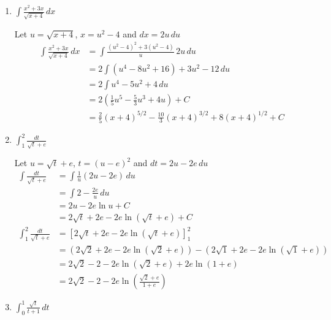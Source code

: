 \documentclass[12pt]{article}
\begin{document}
\begin{enumerate}
\item $\displaystyle\int\frac{x^{2}+3x}{\sqrt{x+4}}\,dx$

Let $u=\sqrt{x+4}$, $x=u^{2}-4$ and $dx=2u\,du$
\begin{equation*}
  \begin{aligned}
  \int\frac{x^{2}+3x}{\sqrt{x+4}}\,dx &= \int\frac{(u^{2}-4)^{2}+3(u^{2}-4)}{u}\,2u\,du\\
  &=2\int(u^{4}-8u^{2}+16)+3u^{2}-12\,du\\
  &=2\int u^{4}-5u^{2}+4\,du\\
  &=2\left(\frac{1}{5}u^{5}-\frac{5}{3}u^{3}+4u\right)+C\\
  &=\frac{2}{5}(x+4)^{5/2}-\frac{10}{3}(x+4)^{3/2}+8(x+4)^{1/2}+C
  \end{aligned}
\end{equation*}

\item $\displaystyle\int_1^2\frac{dt}{\sqrt{t}+e}$

Let $u=\sqrt{t}+e$, $t=(u-e)^{2}$ and $dt=2u-2e\,du$
\begin{equation*}
  \begin{aligned}
  \int\frac{dt}{\sqrt{t}+e} &= \int\frac{1}{u}(2u-2e)\,du\\
  &=\int 2-\frac{2e}{u}\,du\\
  &=2u-2e\ln u+C\\
  &=2\sqrt{t}+2e-2e\ln(\sqrt{t}+e)+C\\
  \int_1^2\frac{dt}{\sqrt{t}+e} &= \left[2\sqrt{t}+2e-2e\ln(\sqrt{t}+e)\right]_1^2\\
  &=(2\sqrt{2}+2e-2e\ln(\sqrt{2}+e))-(2\sqrt{1}+2e-2e\ln(\sqrt{1}+e))\\
  &=2\sqrt{2}-2-2e\ln(\sqrt{2}+e)+2e\ln(1+e)\\
  &=2\sqrt{2}-2-2e\ln\left(\frac{\sqrt{2}+e}{1+e}\right)
  \end{aligned}
\end{equation*}

\item $\displaystyle\int_0^1\frac{\sqrt{t}}{t+1}\,dt$


\end{enumerate}
\end{document}
